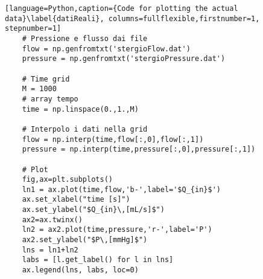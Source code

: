 \begin{lstlisting}[language=Python,caption={Code for plotting the actual data}\label{datiReali}, columns=fullflexible,firstnumber=1, stepnumber=1]
    # Pressione e flusso dai file
    flow = np.genfromtxt('stergioFlow.dat')
    pressure = np.genfromtxt('stergioPressure.dat')

    # Time grid
    M = 1000
    # array tempo
    time = np.linspace(0.,1.,M)

    # Interpolo i dati nella grid
    flow = np.interp(time,flow[:,0],flow[:,1])
    pressure = np.interp(time,pressure[:,0],pressure[:,1])

    # Plot
    fig,ax=plt.subplots()
    ln1 = ax.plot(time,flow,'b-',label='$Q_{in}$')
    ax.set_xlabel("time [s]")
    ax.set_ylabel("$Q_{in}\,[mL/s]$")
    ax2=ax.twinx()
    ln2 = ax2.plot(time,pressure,'r-',label='P')
    ax2.set_ylabel("$P\,[mmHg]$")
    lns = ln1+ln2
    labs = [l.get_label() for l in lns]
    ax.legend(lns, labs, loc=0)
\end{lstlisting}